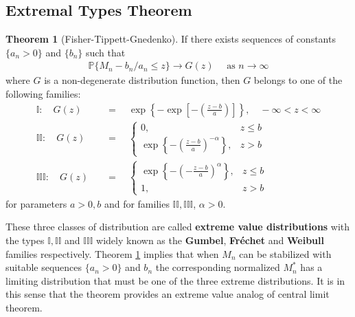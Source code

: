 \documentclass[a4paper,10pt]{article}
\theoremstyle{definition}
\newtheorem{thm}{Theorem}[section]
\numberwithin{equation}{section}
\begin{document}
\subsection{Extremal Types Theorem}

\begin{thm}[Fisher-Tippett-Gnedenko]\label{thm:gfw}
If there exists sequences of constants $\{a_n>0\}$ and $\{b_n\}$ such that 
\begin{align*}
\mathbb{P}\{M_n-b_n/a_n \leq z\} \to G(z) \quad \text{ as } n \to \infty
\end{align*}
where $G$ is a non-degenerate distribution function, then $G$ belongs to one of the following families:
\begin{align*}
\mathbb{I}:\quad G(z)\quad&= \quad\exp \left\{-\exp\left[-\left(\frac{z-b}{a}\right)\right]\right\}, \quad -\infty<z<\infty\\
\mathbb{II}: \quad G(z)\quad&= \quad\begin{cases}
0, & z \leq b\\
\exp\left\{-\left(\frac{z-b}{a}\right)^{-\alpha}\right\}, &z >b
\end{cases}
\\
\mathbb{III}:\quad G(z)\quad&=  \quad\begin{cases}
\exp\left\{-\left(-\frac{z-b}{a}\right)^{\alpha}\right\}, & z \leq b\\
1, &z >b
\end{cases}
\end{align*}
for parameters $a>0, b$ and for families $\mathbb{II}, \mathbb{III}$, $\alpha >0$.
\end{thm}
These three classes of distribution are called \textbf{extreme value distributions} with the types $\mathbb{I},\mathbb{II}$ and $\mathbb{III}$ widely known as the \textbf{Gumbel}, \textbf{Fr\'echet} and \textbf{Weibull} families respectively. Theorem \ref{thm:gfw} implies that when $M_n$ can be stabilized with suitable sequences $\{a_n>0\}$ and $b_n$ the corresponding normalized $M_n^\ast$ has a limiting distribution that must be one of the three extreme distributions. It is in this sense that the theorem provides an extreme value analog of central limit theorem.
\end{document}
